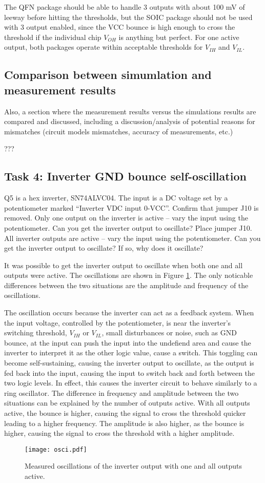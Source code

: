 \documentclass[../main.tex]{subfiles}
\begin{document}
The QFN package should be able to handle 3 outputs with about 100 mV of leeway before hitting the thresholds, but the SOIC package should not be used with 3 output enabled, since the VCC bounce is high enough to cross the threshold if the individual chip $V_{OH}$ is anything but perfect. For one active output, both packages operate within acceptable thresholds for $V_{IH}$ and $V_{IL}$. 


\subsection{Comparison between simumlation and measurement results}

Also, a section where the measurement results versus the simulations results are compared and discussed, including a discussion/analysis of potential reasons for mismatches (circuit models mismatches, accuracy of measurements, etc.)
\solution

???

\subsection{Task 4: Inverter GND bounce self-oscillation}

Q5 is a hex inverter, SN74ALVC04. The input is a DC voltage set by a potentiometer marked “Inverter VDC input 0-VCC”.
\vspace{10pt}
Confirm that jumper J10 is removed. Only one output on the inverter is active – vary the input using the potentiometer. Can you get the inverter output to oscillate?
\vspace{10pt}
Place jumper J10. All inverter outputs are active – vary the input using the potentiometer. Can you get the inverter output to oscillate? If so, why does it oscillate?

\solution

It was possible to get the inverter output to oscillate when both one and all outputs were active. The oscillations are shown in Figure \ref{fig:inverter_oscillation}. The only noticable differences between the two situations are the amplitude and frequency of the oscillations.

The oscillation occurs because the inverter can act as a feedback system. When the input voltage, controlled by the potentiometer, is near the inverter's switching threshold, $V_{IH}$ or $V_{IL}$, small disturbances or noise, such as GND bounce, at the input can push the input into the undefiend area and cause the inverter to interpret it as the other logic value, cause a switch. This toggling can become self-sustaining, causing the inverter output to oscillate, as the output is fed back into the input, causing the input to switch back and forth between the two logic levels. In effect, this causes the inverter circuit to behave similarly to a ring oscillator. The difference in frequency and amplitude between the two situations can be explained by the number of outputs active. With all outputs active, the bounce is higher, causing the signal to cross the threshold quicker leading to a higher frequency. The amplitude is also higher, as the bounce is higher, causing the signal to cross the threshold with a higher amplitude.

\begin{figure}[H]
    \centering
    \texttt{[image: osci.pdf]}
    \caption{Measured oscillations of the inverter output with one and all outputs active.}
    \label{fig:inverter_oscillation}
\end{figure}
\end{document}
